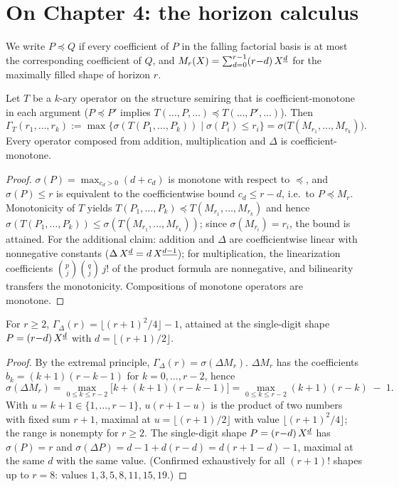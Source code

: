 \section*{On Chapter 4: the horizon calculus}

We write $P\preceq Q$ if every coefficient of $P$ in the falling
factorial basis is at most the corresponding coefficient of $Q$,
and $M_r(X)=\sum_{d=0}^{r-1}(r{-}d)\,X^{\underline{d}}$ for the maximally
filled shape of horizon $r$.

\begin{satz}
Let $T$ be a $k$-ary operator on the structure semiring that is
coefficient-monotone in each argument ($P\preceq P'$ implies
$T(\ldots,P,\ldots)\preceq T(\ldots,P',\ldots)$). Then
\[
\Gamma_T(r_1,\ldots,r_k)
:=\max\{\sigma(T(P_1,\ldots,P_k)) \mid \sigma(P_i)\le r_i\}
=\sigma\bigl(T(M_{r_1},\ldots,M_{r_k})\bigr).
\]
Every operator composed from addition, multiplication and $\Delta$
is coefficient-monotone.
\end{satz}

\begin{proof}
$\sigma(P)=\max_{c_d>0}(d+c_d)$ is monotone with respect to
$\preceq$, and $\sigma(P)\le r$ is equivalent to the
coefficientwise bound $c_d\le r-d$, i.e.\ to $P\preceq M_r$.
Monotonicity of $T$ yields
$T(P_1,\ldots,P_k)\preceq T(M_{r_1},\ldots,M_{r_k})$ and hence
$\sigma(T(P_1,\ldots,P_k))\le\sigma(T(M_{r_1},\ldots,M_{r_k}))$;
since $\sigma(M_{r_i})=r_i$, the bound is attained. For the
additional claim: addition and $\Delta$ are coefficientwise linear
with nonnegative constants ($\Delta\,X^{\underline{d}}=d\,X^{\underline{d-1}}$); for
multiplication, the linearization coefficients
$\binom pj\binom qj\,j!$ of the product formula are nonnegative,
and bilinearity transfers the monotonicity. Compositions of
monotone operators are monotone.
\end{proof}

\begin{satz}
For $r\ge2$,
$\Gamma_\Delta(r)=\bigl\lfloor(r+1)^2/4\bigr\rfloor-1$,
attained at the single-digit shape $P=(r{-}d)\,X^{\underline{d}}$ with
$d=\lfloor(r+1)/2\rfloor$.
\end{satz}

\begin{proof}
By the extremal principle, $\Gamma_\Delta(r)=\sigma(\Delta M_r)$.
$\Delta M_r$ has the coefficients $b_k=(k{+}1)(r{-}k{-}1)$ for
$k=0,\ldots,r{-}2$, hence
\[
\sigma(\Delta M_r)
=\max_{0\le k\le r-2}\bigl[k+(k{+}1)(r{-}k{-}1)\bigr]
=\max_{0\le k\le r-2}(k{+}1)(r{-}k)\;-\;1 .
\]
With $u=k{+}1\in\{1,\ldots,r{-}1\}$, $u(r{+}1{-}u)$ is the product
of two numbers with fixed sum $r{+}1$, maximal at
$u=\lfloor(r{+}1)/2\rfloor$ with value
$\lfloor(r{+}1)^2/4\rfloor$; the range is nonempty for $r\ge2$.
The single-digit shape $P=(r{-}d)\,X^{\underline{d}}$ has $\sigma(P)=r$ and
$\sigma(\Delta P)=d-1+d(r{-}d)=d(r{+}1{-}d)-1$, maximal at the
same $d$ with the same value. (Confirmed exhaustively for all
$(r{+}1)!$ shapes up to $r=8$: values $1,3,5,8,11,15,19$.)
\end{proof}

